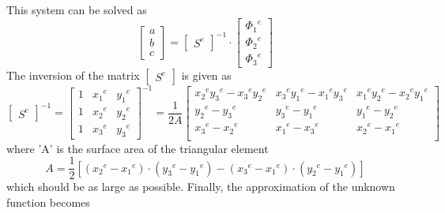 This system can be solved as
\begin{equation*}
	\begin{bmatrix}
		a \\
		b \\
		c
	\end{bmatrix}
	= 
	\begin{bmatrix}
		S^e
	\end{bmatrix}^{-1}
	\cdot
	\begin{bmatrix}
		{\Phi_1}^e \\
		{\Phi_2}^e \\
		{\Phi_3}^e
	\end{bmatrix}
\end{equation*}
The inversion of the matrix $\begin{bmatrix}S^e\end{bmatrix}$ is given as
\begin{equation*}
	\begin{bmatrix}
		S^e
	\end{bmatrix}^{-1}
	= 
	\begin{bmatrix}
		1 & {x_1}^e & {y_1}^e \\
		1 & {x_2}^e & {y_2}^e \\
		1 & {x_3}^e & {y_3}^e 
	\end{bmatrix}^{-1}
	= \frac{1}{2A}
	\begin{bmatrix}
		{x_2}^e {y_3}^e - {x_3}^e{y_2}^e & {x_3}^e {y_1}^e - {x_1}^e{y_3}^e & {x_1}^e {y_2}^e - {x_2}^e{y_1}^e \\
		{y_2}^e - {y_3}^e & {y_3}^e - {y_1}^e & {y_1}^e - {y_2}^e \\
		{x_3}^e - {x_2}^e & {x_1}^e - {x_3}^e & {x_2}^e - {x_1}^e \\
 	\end{bmatrix}
\end{equation*}
where 'A' is the surface area of the triangular element
\begin{equation*}
	A = \frac{1}{2} \left[\left({x_2}^e - {x_1}^e\right) \cdot \left({y_3}^e - {y_1}^e\right) - \left({x_3}^e - {x_1}^e\right) \cdot \left({y_2}^e - {y_1}^e\right) \right]
\end{equation*}
which should be as large as possible. Finally, the approximation of the unknown function becomes
